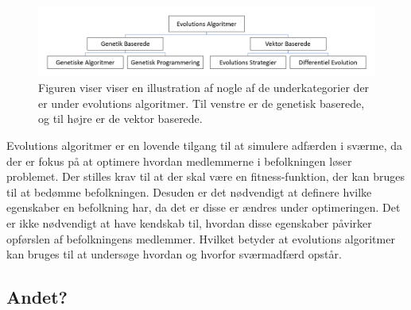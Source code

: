 \begin{figure}[H]
    \centering
    \includegraphics[width=1\textwidth]{figures/EA-kategorier.PNG}
    \caption{Figuren viser viser en illustration af nogle af de underkategorier der er under evolutions algoritmer. Til          venstre er de genetisk baserede, og til højre er de vektor baserede.}
    \label{EA-Kategorier}
\end{figure}

Evolutions algoritmer er en lovende tilgang til at simulere adfærden i sværme, da der er fokus på at optimere hvordan medlemmerne i befolkningen løser problemet. Der stilles krav til at der skal være en fitness-funktion, der kan bruges til at bedømme befolkningen. Desuden er det nødvendigt at definere hvilke egenskaber en befolkning har, da det er disse er ændres under optimeringen. Det er ikke nødvendigt at have kendskab til, hvordan disse egenskaber påvirker opførslen af befolkningens medlemmer. Hvilket betyder at evolutions algoritmer kan bruges til at undersøge hvordan og hvorfor sværmadfærd opstår.


\subsection*{Andet?}

